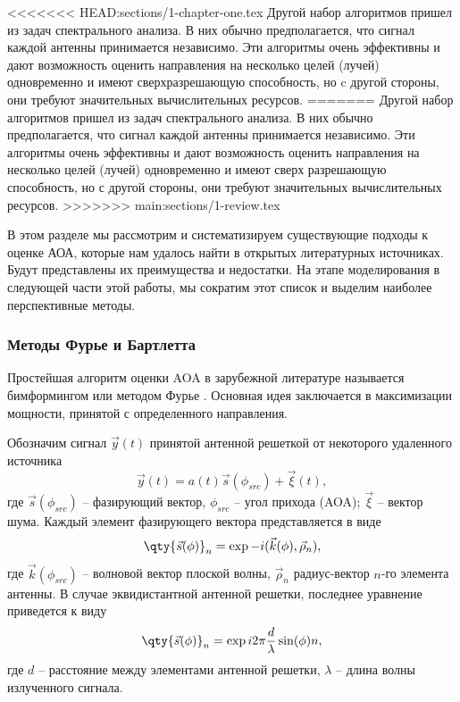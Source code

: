 <<<<<<< HEAD:sections/1-chapter-one.tex
Другой набор алгоритмов пришел из задач спектрального анализа.
В них обычно предполагается, что сигнал каждой антенны принимается независимо.
Эти алгоритмы очень эффективны и дают возможность оценить направления на
несколько целей (лучей) одновременно и имеют сверхразрешающую способность, но c другой стороны, они требуют значительных вычислительных ресурсов.  
=======
Другой набор алгоритмов пришел из задач спектрального анализа.  В них обычно
предполагается, что сигнал каждой антенны принимается независимо.  Эти алгоритмы
очень эффективны и дают возможность оценить направления на несколько целей
(лучей) одновременно и имеют сверх разрешающую способность, но с другой стороны,
они требуют значительных вычислительных ресурсов.  
>>>>>>> main:sections/1-review.tex

В этом разделе мы рассмотрим и систематизируем существующие подходы к оценке
АОА, которые нам удалось найти в открытых литературных источниках.  Будут
представлены их преимущества и недостатки.  На этапе моделирования в следующей
части этой работы, мы сократим этот список и выделим наиболее перспективные
методы.

\subsubsection{Методы Фурье и Бартлетта}
\label{sec:3.2.1}

Простейшая алгоритм оценки AOA в зарубежной литературе называется бимформингом \cite{Tuncer2009, Stoica2005} или методом Фурье \cite{Allen2006}.
Основная идея заключается в максимизации мощности, принятой с определенного
направления.

Обозначим сигнал $\vec{y}(t)$ принятой антенной решеткой от некоторого
удаленного источника
\begin{equation}
    \label{eq:3.1}
    \vec{y}(t) = a(t) \vec{s}(\phi_{src}) + \vec{\xi}(t),
\end{equation}
где ${\vec{s}(\phi_{src})}$ -- фазирующий вектор,
$\phi_{src}$ -- угол прихода (AOA); $\vec \xi$ -- вектор шума.
Каждый элемент фазирующего вектора представляется в виде
\begin{equation}
    \qty{\vec{s}(\phi)}_n = \exp{-i(\vec k (\phi), \vec \rho_n)},
\end{equation}
где $\vec k (\phi_{src})$ -- волновой вектор плоской волны, $\vec\rho_n$ радиус-вектор
$n$-го элемента антенны.
В случае эквидистантной антенной решетки, последнее уравнение приведется
к виду
\begin{equation}
    \qty{\vec s(\phi)}_n = \exp{i2\pi\frac{d}{\lambda}\sin(\phi)n},
\end{equation}
где $d$ -- расстояние между элементами антенной решетки, $\lambda$ -- длина
волны излученного сигнала.

